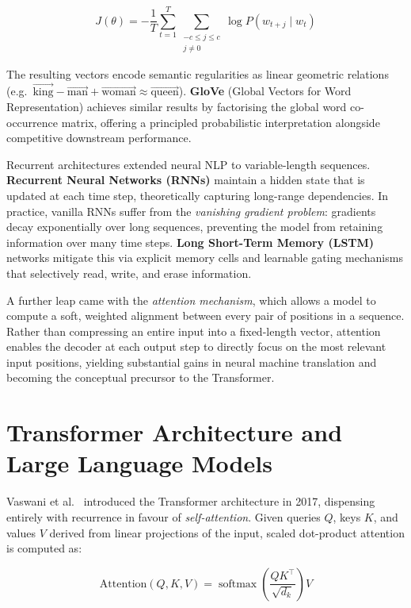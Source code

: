 \documentclass[12pt, a4paper]{article}
\begin{document}
\[
  J(\theta) = -\frac{1}{T} \sum_{t=1}^{T}
              \sum_{\substack{-c \leq j \leq c \\ j \neq 0}}
              \log P(w_{t+j} \mid w_t)
\]

The resulting vectors encode semantic regularities as linear geometric
relations (e.g.\ $\vec{\text{king}} - \vec{\text{man}} + \vec{\text{woman}}
\approx \vec{\text{queen}}$). \textbf{GloVe} (Global Vectors for Word
Representation) achieves similar results by factorising the global word
co-occurrence matrix, offering a principled probabilistic interpretation
alongside competitive downstream performance.

Recurrent architectures extended neural NLP to variable-length sequences.
\textbf{Recurrent Neural Networks (RNNs)} maintain a hidden state that is
updated at each time step, theoretically capturing long-range dependencies.
In practice, vanilla RNNs suffer from the \textit{vanishing gradient problem}:
gradients decay exponentially over long sequences, preventing the model from
retaining information over many time steps. \textbf{Long Short-Term Memory
(LSTM)} networks mitigate this via explicit memory cells and learnable gating
mechanisms that selectively read, write, and erase information.

A further leap came with the \textit{attention mechanism}, which allows a model
to compute a soft, weighted alignment between every pair of positions in a
sequence. Rather than compressing an entire input into a fixed-length vector,
attention enables the decoder at each output step to directly focus on the most
relevant input positions, yielding substantial gains in neural machine
translation and becoming the conceptual precursor to the Transformer.


\section{Transformer Architecture and Large Language Models}

Vaswani et al.~\cite{vaswani2017attention} introduced the Transformer
architecture in 2017, dispensing entirely with recurrence in favour of
\textit{self-attention}. Given queries $Q$, keys $K$, and values $V$ derived
from linear projections of the input, scaled dot-product attention is computed
as:

\[
  \text{Attention}(Q,K,V) =
    \operatorname{softmax}\!\left(\frac{QK^{\top}}{\sqrt{d_k}}\right)V
\]
\end{document}
